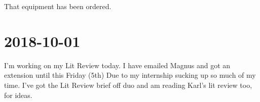 \documentclass{article}
\begin{document}
	That equipment has been ordered.

	\section{2018-10-01}
	I'm working on my Lit Review today. I have emailed Magnus and got an extension until this Friday (5th) Due to my internship sucking up so much of my time. I've got the Lit Review brief off duo and am reading Karl's lit review too, for ideas.
		
\end{document}
